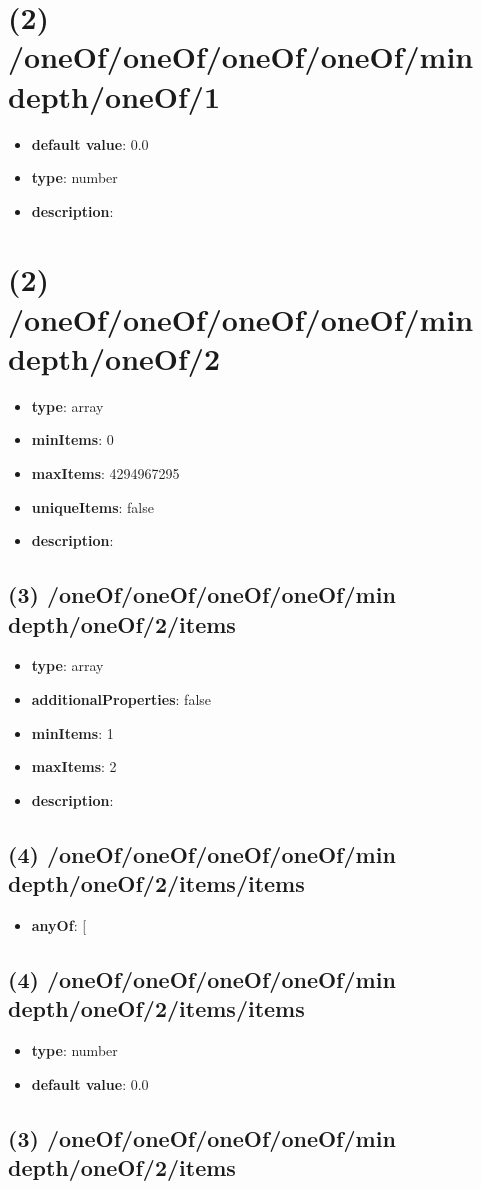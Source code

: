 \section{(2) /oneOf/oneOf/oneOf/oneOf/min depth/oneOf/1}
\begin{itemize}[leftmargin=2em]\item {\bf default value}: 0.0
\item {\bf type}: number
\item {\bf description}: 
\end{itemize}\section{(2) /oneOf/oneOf/oneOf/oneOf/min depth/oneOf/2}
\begin{itemize}[leftmargin=2em]\item {\bf type}: array
\item {\bf minItems}: 0
\item {\bf maxItems}: 4294967295
\item {\bf uniqueItems}: false
\item {\bf description}: 
\end{itemize}\subsection{(3) /oneOf/oneOf/oneOf/oneOf/min depth/oneOf/2/items}
\begin{itemize}[leftmargin=3em]\item {\bf type}: array
\item {\bf additionalProperties}: false
\item {\bf minItems}: 1
\item {\bf maxItems}: 2
\item {\bf description}: 
\end{itemize}\subsection{(4) /oneOf/oneOf/oneOf/oneOf/min depth/oneOf/2/items/items}
\begin{itemize}[leftmargin=4em]\item {\bf anyOf}: [\end{itemize}\subsection{(4) /oneOf/oneOf/oneOf/oneOf/min depth/oneOf/2/items/items}
\begin{itemize}[leftmargin=4em]\item {\bf type}: number\item {\bf default value}: 0.0
\end{itemize}\subsection{(3) /oneOf/oneOf/oneOf/oneOf/min depth/oneOf/2/items}
